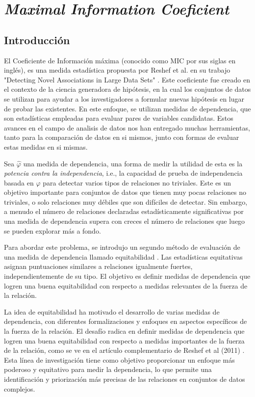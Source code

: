 \chapter{\textit{Maximal Information Coeficient}}

\section{Introducci\'on}

El Coeficiente de Informaci\'on m\'axima (conocido como MIC por sus siglas en ingl\'es), es una medida estad\'istica propuesta por Reshef et al. en su trabajo "Detecting Novel Associations in Large Data Sets" \cite{Reshef2011}. Este coeficiente fue creado en el contexto de la ciencia generadora de hip\'otesis, en la cual los conjuntos de datos se utilizan para ayudar a los investigadores a formular nuevas hip\'otesis en lugar de probar las existentes. En este enfoque, se utilizan medidas de dependencia, que son estad\'isticas empleadas para evaluar pares de variables candidatas. Estos avances en el campo de analisis de datos nos han entregado muchas herramientas, tanto para la comparaci\'on de datos en si mismos, junto con formas de evaluar estas medidas en si mismas.

Sea $\hat\varphi$ una medida de dependencia, una forma de medir la utilidad de esta es la \textit{potencia contra la independencia}, i.e., la capacidad de prueba de independencia basada en $\hat\varphi$ para detectar varios tipos de relaciones no triviales. Este es un objetivo importante para conjuntos de datos que tienen muy pocas relaciones no triviales, o solo relaciones muy d\'ebiles que son dif\'iciles de detectar. Sin embargo, a menudo el n\'umero de relaciones declaradas estad\'isticamente significativas por una medida de dependencia supera con creces el n\'umero de relaciones que luego se pueden explorar m\'as a fondo.

Para abordar este problema, se introdujo un segundo m\'etodo de evaluaci\'on de una medida de dependencia llamado equitabilidad \cite{Reshef2011}. Las estad\'isticas equitativas asignan puntuaciones similares a relaciones igualmente fuertes, independientemente de su tipo. El objetivo es definir medidas de dependencia que logren una buena equitabilidad con respecto a medidas relevantes de la fuerza de la relaci\'on. 

La idea de equitabilidad ha motivado el desarrollo de varias medidas de dependencia, con diferentes formalizaciones y enfoques en aspectos espec\'ificos de la fuerza de la relaci\'on. El desaf\'io radica en definir medidas de dependencia que logren una buena equitabilidad con respecto a medidas importantes de la fuerza de la relaci\'on, como se ve en el art\'iculo complementario de Reshef et al (2011) \cite{Reshef2011}. Esta l\'inea de investigaci\'on tiene como objetivo proporcionar un enfoque m\'as poderoso y equitativo para medir la dependencia, lo que permite una identificaci\'on y priorizaci\'on m\'as precisas de las relaciones en conjuntos de datos complejos.

